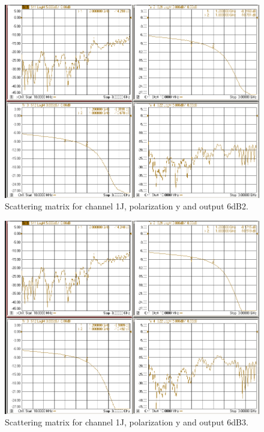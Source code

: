 \documentclass[12pt,a4paper,oneside]{article}
\begin{document}
\begin{figure}[H]
\centering
\includegraphics[width=0.9\linewidth]{VNA_results/1Jy_6dB2.png}
\caption{Scattering matrix for channel 1J, polarization y and output 6dB2.}
\label{fig:1Jy_6dB2}
\end{figure}


\begin{figure}[H]
\centering
\includegraphics[width=0.9\linewidth]{VNA_results/1Jy_6dB3.png}
\caption{Scattering matrix for channel 1J, polarization y and output 6dB3.}
\label{fig:1Jy_6dB3}
\end{figure}
\end{document}
